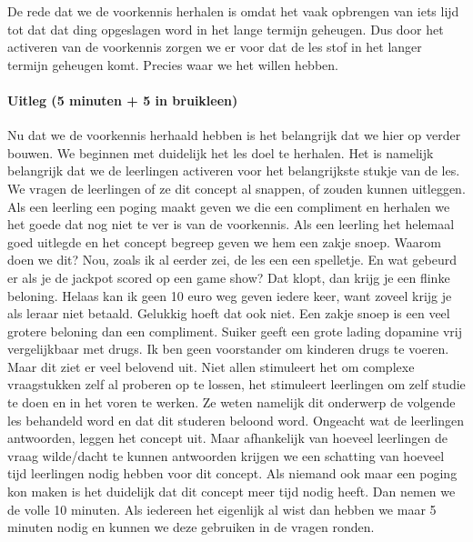 \documentclass{article}
\begin{document}
                    \bigskip
                    \noindent De rede dat we de voorkennis herhalen is omdat het vaak opbrengen van iets lijd tot dat dat ding opgeslagen word in het lange termijn geheugen.\cite{repeating-leads-to-long-term-memory} Dus door het activeren van de voorkennis zorgen we er voor dat de les stof in het langer termijn geheugen komt. Precies waar we het willen hebben.
                \paragraph{Uitleg (5 minuten + 5 in bruikleen)}
                    Nu dat we de voorkennis herhaald hebben is het belangrijk dat we hier op verder bouwen. We beginnen met duidelijk het les doel te herhalen. Het is namelijk belangrijk dat we de leerlingen activeren voor het belangrijkste stukje van de les. We vragen de leerlingen of ze dit concept al snappen, of zouden kunnen uitleggen. 
                    \bigskip
                    \noindent Als een leerling een poging maakt geven we die een compliment en herhalen we het goede dat nog niet te ver is van de voorkennis. Als een leerling het helemaal goed uitlegde en het concept begreep geven we hem een zakje snoep. Waarom doen we dit? Nou, zoals ik al eerder zei, de les een een spelletje. En wat gebeurd er als je de jackpot scored op een game show? Dat klopt, dan krijg je een flinke beloning. 
                    \bigskip
                    \noindent Helaas kan ik geen 10 euro weg geven iedere keer, want zoveel krijg je als leraar niet betaald. Gelukkig hoeft dat ook niet. Een zakje snoep is een veel grotere beloning dan een compliment. Suiker geeft een grote lading dopamine vrij vergelijkbaar met drugs.\cite{sugar-equals-drugs} Ik ben geen voorstander om kinderen drugs te voeren. Maar dit ziet er veel belovend uit. Niet allen stimuleert het om complexe vraagstukken zelf al proberen op te lossen, het stimuleert leerlingen om zelf studie te doen en in het voren te werken. Ze weten namelijk dit onderwerp de volgende les behandeld word en dat dit studeren beloond word. 
                    \bigskip
                    \noindent Ongeacht wat de leerlingen antwoorden, leggen het concept uit. Maar afhankelijk van hoeveel leerlingen de vraag wilde/dacht te kunnen antwoorden krijgen we een schatting van hoeveel tijd leerlingen nodig hebben voor dit concept. Als niemand ook maar een poging kon maken is het duidelijk dat dit concept meer tijd nodig heeft. Dan nemen we de volle 10 minuten. Als iedereen het eigenlijk al wist dan hebben we maar 5 minuten nodig en kunnen we deze gebruiken in de vragen ronden. 
\end{document}
